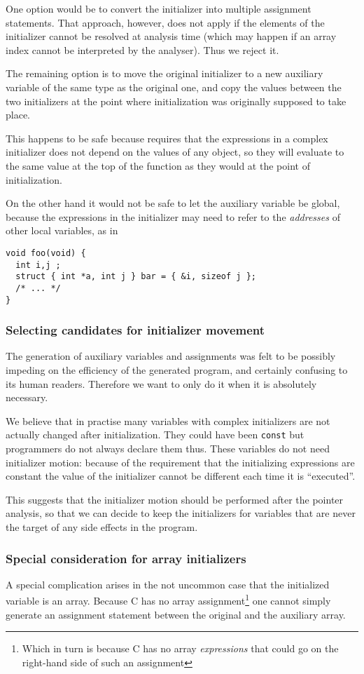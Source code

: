 \begin{docpart}
One option would be to convert the initializer into multiple
assignment statements. That approach, however, does not apply
if the elements of the initializer cannot be resolved at analysis
time (which may happen if an array index cannot be interpreted by
the analyser). Thus we reject it.

The remaining option is to move the original initializer to a new
auxiliary variable of the same type as the original one, and copy
the values between the two initializers at the point where
initialization was originally supposed to take place.

This happens to be safe because \ansiC requires that the
expressions in a complex initializer does not depend on the
values of any object, so they will evaluate to the same value
at the top of the function as they would at the point of
initialization.

On the other hand it would not be safe to let the auxiliary
variable be global, because the expressions in the initializer may
need to refer to the \emph{addresses} of other local variables, as in
\begin{verbatim}
void foo(void) {
  int i,j ;
  struct { int *a, int j } bar = { &i, sizeof j };
  /* ... */
}
\end{verbatim}

\subsubsection{Selecting candidates for initializer movement}
The generation of auxiliary variables and assignments was felt
to be possibly impeding on the efficiency of the generated program,
and certainly confusing to its human readers. Therefore we want
to only do it when it is absolutely necessary.

We believe that in practise many variables with complex initializers
are not actually changed after initialization. They could have been
\texttt{const} but programmers do not always declare them thus.
These variables do not need initializer motion: because of the
requirement that the initializing expressions are constant the
value of the initializer cannot be different each time it is
``executed''.

This suggests that the initializer motion should be performed
after the pointer analysis, so that we can decide to keep
the initializers for variables that are never the target of
any side effects in the program.

\subsubsection{Special consideration for array initializers}
A special complication arises in the not uncommon case that the
initialized variable is an array. Because C has no array assignment\footnote
{Which in turn is because C has no array \emph{expressions} that
could go on the right-hand side of such an assignment} one cannot
simply generate an assignment statement between the original and
the auxiliary array.


\end{docpart}
